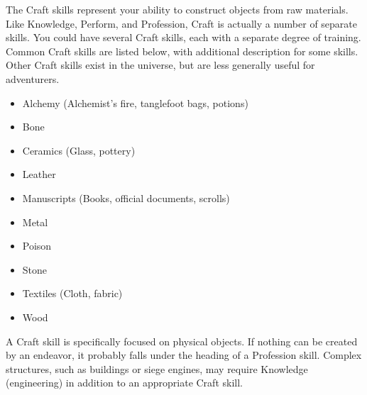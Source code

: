 \newpage
{}
  The Craft skills represent your ability to construct objects from raw materials.
  Like Knowledge, Perform, and Profession, Craft is actually a number of separate skills.
  You could have several Craft skills, each with a separate degree of training.
  Common Craft skills are listed below, with additional description for some skills.
  Other Craft skills exist in the universe, but are less generally useful for adventurers.

  \begin{itemize}
    \item Alchemy (Alchemist's fire, tanglefoot bags, potions)
    \item Bone
    \item Ceramics (Glass, pottery)
    \item Leather
    \item Manuscripts (Books, official documents, scrolls)
    \item Metal
    \item Poison
    \item Stone
    \item Textiles (Cloth, fabric)
    \item Wood
  \end{itemize}

  A Craft skill is specifically focused on physical objects. If nothing can be created by an endeavor, it probably falls under the heading of a Profession skill. Complex structures, such as buildings or siege engines, may require Knowledge (engineering) in addition to an appropriate Craft skill.

